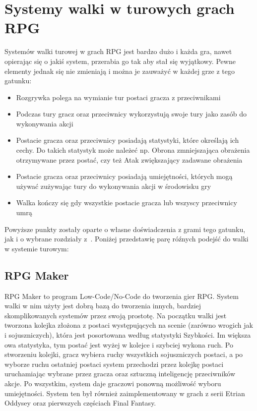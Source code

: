 \documentclass{SGGW-thesis}
\begin{document}
\section{Systemy walki w turowych grach RPG}
Systemów walki turowej w grach RPG jest bardzo dużo i każda gra, nawet opierając się o jakiś system, przerabia go tak aby stał się wyjątkowy. Pewne elementy jednak się nie zmieniają i można je zauważyć w każdej grze z tego gatunku:
\begin{itemize}
  \item{Rozgrywka polega na wymianie tur postaci gracza z przeciwnikami}
  \item{Podczas tury gracz oraz przeciwnicy wykorzystują swoje tury jako zasób do wykonywania akcji}
  \item{Postacie gracza oraz przeciwnicy posiadają statystyki, które określają ich cechy. Do takich statystyk może należeć np. Obrona zmniejszająca obrażenia otrzymywane przez postać, czy też Atak zwiększający zadawane obrażenia}
  \item{Postacie gracza oraz przeciwnicy posiadają umiejętności, których mogą używać zużywając tury do wykonywania akcji w środowisku gry}
  \item{Walka kończy się gdy wszystkie postacie gracza lub wszyscy przeciwnicy umrą}
\end{itemize}
Powyższe punkty zostały oparte o własne doświadczenia z grami tego gatunku, jak i o wybrane rozdziały z~\cite{RLLearningInTBRPG, PlayerPreferencesInRPGs}. Poniżej przedstawię parę róźnych podejść do walki w systemie turowym:
\subsection{RPG Maker}
RPG Maker to program Low-Code/No-Code do tworzenia gier RPG. System walki w nim użyty jest dobrą bazą do tworzenia innych, 
bardziej skomplikowanych systemów przez swoją prostotę. Na początku walki jest tworzona kolejka złożona z postaci występujących na scenie 
(zarówno wrogich jak i sojuszniczych), która jest posortowana według statystyki Szybkości. Im większa owa statystyka, tym postać jest wyżej w 
kolejce i szybciej wykona ruch. Po stworzeniu kolejki, gracz wybiera ruchy wszystkich sojuszniczych postaci, a po wyborze ruchu ostatniej postaci
system przechodzi przez kolejkę postaci uruchamiając wybrane przez gracza oraz sztuczną inteligencję przeciwników akcje. Po wszystkim, 
system daje graczowi ponowną możliwość wyboru umiejętności. System ten był również zaimplementowany w grach z serii Etrian Oddysey oraz 
pierwszych częściach Final Fantasy.
\end{document}
